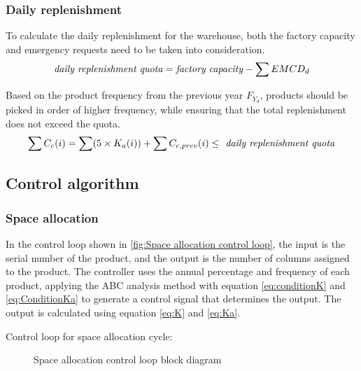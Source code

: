 \subsubsection{Daily replenishment}

To calculate the daily replenishment for the warehouse, both the factory capacity and emergency requests need to be taken into consideration.
    \begin{equation}\label{eq:drq}
        \text{\emph{daily replenishment quota}} = 
        \text{\emph{factory capacity}} - \sum EMC{D_d} 
    \end{equation}

Based on the product frequency from the previous year ${ F_{Y_d} }$, products should be picked in order of higher frequency, while ensuring that the total replenishment does not exceed the quota.
    \begin{equation}\label{eq:quota}
        \sum C_c(i) = \sum (5 \times K_a(i)) + \sum C_{c,prev}(i)
        \leq \text{\emph{ daily replenishment quota}}
    \end{equation}

\subsection{Control algorithm}

\subsubsection{Space allocation}\label{ca:space allocation}

In the control loop shown in \autoref{fig:Space allocation control loop}, the input is the serial number of the product, and the output is the number of columns assigned to the product. The controller uses the annual percentage and frequency of each product, applying the ABC analysis method with equation \eqref{eq:conditionK} and \eqref{eq:ConditionKa} to generate a control signal that determines the output. The output is calculated using equation \eqref{eq:K} and \eqref{eq:Ka}.

    Control loop for space allocation cycle:
    \begin{figure}[!ht]
        \centering
        \caption{Space allocation control loop block diagram}
        \label{fig:Space allocation control loop}
    \end{figure}

